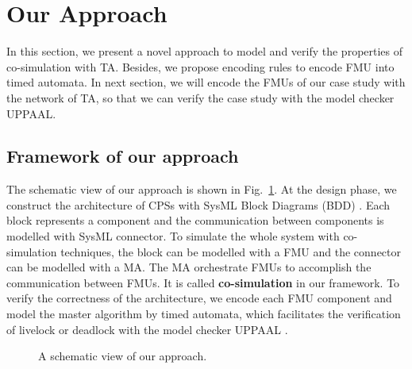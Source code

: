\section{Our Approach}
In this section, we present a novel approach to model and verify the properties of co-simulation with TA. Besides, we propose encoding rules to encode FMU into timed automata. In next section, we will encode the FMUs of our case study with the network of TA, so that we can verify the case study with the model checker UPPAAL.
\label{sec:encoding}
\subsection{Framework of our approach}
The schematic view of our approach is shown in Fig.~\ref{paper-arc}. At the design phase, we construct the architecture of CPSs with SysML Block Diagrams (BDD) \cite{RahimHI17}. Each block represents a component and the communication between components is modelled with SysML connector. To simulate the whole system with co-simulation techniques, the block can be modelled with a FMU and the connector can be modelled with a MA. The MA orchestrate FMUs to accomplish the communication between FMUs. It is called \textbf{co-simulation} in our framework. To verify the correctness of the architecture, we encode each FMU component and model the master algorithm by timed automata, which facilitates the verification of livelock or deadlock with the model checker UPPAAL \cite{BehrmannDLHPYH06}.
\begin{figure}[htbp]
	\caption{A schematic view of our approach.}
	\label{paper-arc}
\end{figure}

